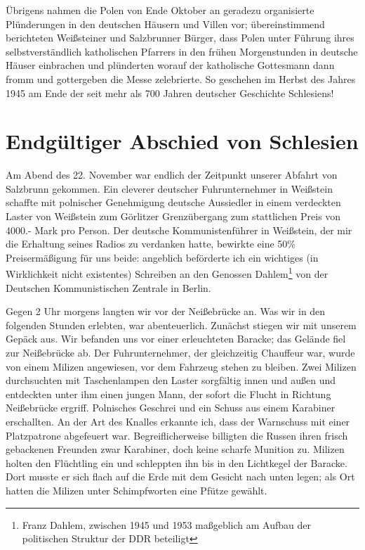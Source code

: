 \documentclass[a5paper,pagesize,10pt,twoside=true]{scrbook}
\renewcommand{\marginpar}[2][]{}
\begin{document}
Übrigens nahmen die Polen von Ende Oktober an geradezu organisierte Plünderungen in den deutschen Häusern und Villen vor; übereinstimmend berichteten Weißsteiner und Salzbrunner Bürger, dass Polen unter Führung ihres selbstverständlich katholischen Pfarrers in den frühen Morgenstunden in deutsche Häuser einbrachen und plünderten worauf der katholische Gottesmann dann fromm und gottergeben die Messe zelebrierte. So geschehen im Herbst des Jahres 1945 am Ende der seit mehr als 700 Jahren deutscher Geschichte Schlesiens!

\section{Endgültiger Abschied von Schlesien}
Am Abend des 22. November war endlich der Zeitpunkt unserer Abfahrt von Salzbrunn gekommen. Ein cleverer deutscher Fuhrunternehmer in Weißstein schaffte mit polnischer Genehmigung deutsche Aussiedler in einem verdeckten Laster von Weißstein zum Görlitzer Grenzübergang zum stattlichen Preis von 4000.- Mark pro Person. Der deutsche Kommunistenführer in Weißstein, der mir die Erhaltung seines Radios zu verdanken hatte, bewirkte eine 50\% Preisermäßigung für uns beide: angeblich beförderte ich ein wichtiges (in Wirklichkeit nicht existentes) Schreiben an den Genossen Dahlem\footnote{Franz Dahlem, zwischen 1945 und 1953 maßgeblich am Aufbau der politischen Struktur der DDR beteiligt} von der Deutschen Kommunistischen Zentrale in Berlin.

\marginpar{118} Gegen 2 Uhr morgens langten wir vor der Neißebrücke an. Was wir in den folgenden Stunden erlebten, war abenteuerlich. Zunächst stiegen wir mit unserem Gepäck aus. Wir befanden uns vor einer erleuchteten Baracke; das Gelände fiel zur Neißebrücke ab. Der Fuhrunternehmer, der gleichzeitig Chauffeur war, wurde von einem Milizen angewiesen, vor dem Fahrzeug stehen zu bleiben. Zwei Milizen durchsuchten mit Taschenlampen den Laster sorgfältig innen und außen und entdeckten unter ihm einen jungen Mann, der sofort die Flucht in Richtung Neißebrücke ergriff. Polnisches Geschrei und ein Schuss aus einem Karabiner erschallten. An der Art des Knalles erkannte ich, dass der Warnschuss mit einer Platzpatrone abgefeuert war. Begreiflicherweise billigten die Russen ihren frisch gebackenen Freunden zwar Karabiner, doch keine scharfe Munition zu. Milizen holten den Flüchtling ein und schleppten ihn bis in den Lichtkegel der Baracke. Dort musste er sich flach auf die Erde mit dem Gesicht nach unten legen; als Ort hatten die Milizen unter Schimpfworten eine Pfütze gewählt.
\end{document}
